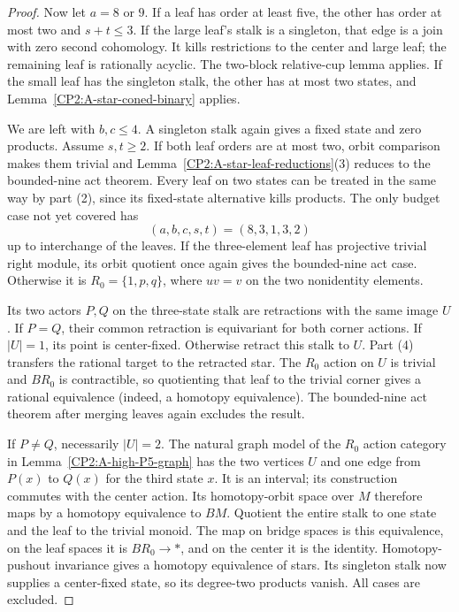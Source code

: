 \begin{proof}
Now let $a=8$ or $9$. If a leaf has order at least five,
the other has order at most two and $s+t\le3$. If the
large leaf's stalk is a singleton, that edge is a join
with zero second cohomology. It kills restrictions to
the center and large leaf; the remaining leaf is rationally
acyclic. The two-block relative-cup lemma applies. If the
small leaf has the singleton stalk, the other has at most
two states, and Lemma~\ref{CP2:A-star-coned-binary} applies.

We are left with $b,c\le4$. A singleton stalk again gives
a fixed state and zero products. Assume $s,t\ge2$. If
both leaf orders are at most two, orbit comparison makes
them trivial and Lemma~\ref{CP2:A-star-leaf-reductions}(3)
reduces to the bounded-nine act theorem. Every leaf on
two states can be treated in the same way by part (2),
since its fixed-state alternative kills products. The
only budget case not yet covered has
\[
 (a,b,c,s,t)=(8,3,1,3,2)
\]
up to interchange of the leaves. If the three-element
leaf has projective trivial right module, its orbit
quotient once again gives the bounded-nine act case.
Otherwise it is $R_0=\{1,p,q\}$, where $uv=v$ on the
two nonidentity elements.

Its two actors $P,Q$ on the three-state stalk are
retractions with the same image $U$. If $P=Q$, their
common retraction is equivariant for both corner actions.
If $|U|=1$, its point is center-fixed. Otherwise retract
this stalk to $U$. Part (4) transfers the rational target
to the retracted star. The $R_0$ action on $U$ is trivial
and $BR_0$ is contractible, so quotienting that leaf to
the trivial corner gives a rational equivalence (indeed,
a homotopy equivalence). The bounded-nine act theorem
after merging leaves again excludes the result.

If $P\ne Q$, necessarily $|U|=2$. The natural graph model
of the $R_0$ action category in
Lemma~\ref{CP2:A-high-P5-graph} has the two vertices $U$
and one edge from $P(x)$ to $Q(x)$ for the third state
$x$. It is an interval; its construction commutes with
the center action. Its homotopy-orbit space over $M$
therefore maps by a homotopy equivalence to $BM$.
Quotient the entire stalk to one state and the leaf to
the trivial monoid. The map on bridge spaces is this
equivalence, on the leaf spaces it is $BR_0\to *$, and
on the center it is the identity. Homotopy-pushout
invariance gives a homotopy equivalence of stars. Its
singleton stalk now supplies a center-fixed state, so
its degree-two products vanish. All cases are excluded.
\end{proof}
